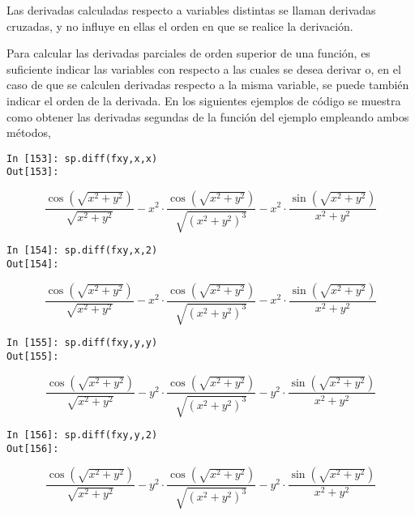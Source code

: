 \begin{paracol}{2}
Las derivadas calculadas respecto a variables distintas se llaman derivadas cruzadas, y no influye en ellas el orden en que se realice la derivación.

Para calcular las derivadas parciales de orden superior de una función, es suficiente indicar las variables con respecto a las cuales se desea derivar o, en el caso de que se calculen derivadas respecto a la misma variable, se puede también indicar el orden de la derivada. En los siguientes ejemplos de código se muestra como obtener las derivadas segundas de la función del ejemplo empleando ambos métodos,
\end{paracol}
\begin{center}
	\begin{minipage}{.6\textwidth}
		\begin{verbatim}
In [153]: sp.diff(fxy,x,x)
Out[153]: 	
		\end{verbatim}
		\begin{equation*}
			\frac{\cos(\sqrt{x^2+y^2})}{\sqrt{x^2+y^2}} - 
			x^2 \cdot \frac{\cos(\sqrt{x^2+y^2})}{\sqrt{(x^2+y^2)^3}} -
			x^2 \cdot \frac{\sin(\sqrt{x^2+y^2})}{x^2+y^2}
		\end{equation*}
		\begin{verbatim}
In [154]: sp.diff(fxy,x,2)
Out[154]:  
		\end{verbatim}
		\begin{equation*}
			\frac{\cos(\sqrt{x^2+y^2})}{\sqrt{x^2+y^2}} - 
			x^2 \cdot \frac{\cos(\sqrt{x^2+y^2})}{\sqrt{(x^2+y^2)^3}} -
			x^2 \cdot \frac{\sin(\sqrt{x^2+y^2})}{x^2+y^2}
		\end{equation*}
		\begin{verbatim}
In [155]: sp.diff(fxy,y,y)
Out[155]:   
		\end{verbatim}
		\begin{equation*} \frac{\cos(\sqrt{x^2+y^2})}{\sqrt{x^2+y^2}} - 
			y^2 \cdot \frac{\cos(\sqrt{x^2+y^2})}{\sqrt{(x^2+y^2)^3}} -
			y^2 \cdot \frac{\sin(\sqrt{x^2+y^2})}{x^2+y^2}
		\end{equation*}
		\begin{verbatim}
In [156]: sp.diff(fxy,y,2)
Out[156]:    
		\end{verbatim}
		\begin{equation*} \frac{\cos(\sqrt{x^2+y^2})}{\sqrt{x^2+y^2}} - 
			y^2 \cdot \frac{\cos(\sqrt{x^2+y^2})}{\sqrt{(x^2+y^2)^3}} -
			y^2 \cdot \frac{\sin(\sqrt{x^2+y^2})}{x^2+y^2}
		\end{equation*}
		\begin{verbatim}

\end{verbatim}
\end{minipage}
\end{center}
